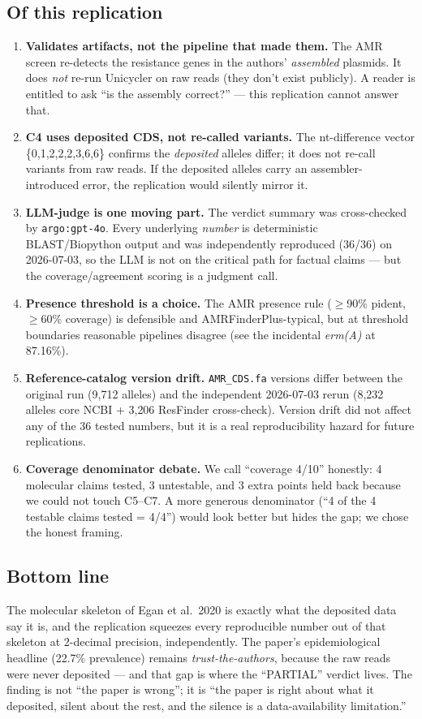 \documentclass[11pt,letterpaper]{article}
\begin{document}
\subsection{Of this replication}
\begin{enumerate}[leftmargin=*]
\item \textbf{Validates artifacts, not the pipeline that made them.} The AMR screen re-detects the resistance genes in the authors' \emph{assembled} plasmids. It does \emph{not} re-run Unicycler on raw reads (they don't exist publicly). A reader is entitled to ask ``is the assembly correct?'' --- this replication cannot answer that.
\item \textbf{C4 uses deposited CDS, not re-called variants.} The nt-difference vector \{0,1,2,2,2,3,6,6\} confirms the \emph{deposited} alleles differ; it does not re-call variants from raw reads. If the deposited alleles carry an assembler-introduced error, the replication would silently mirror it.
\item \textbf{LLM-judge is one moving part.} The verdict summary was cross-checked by \texttt{argo:gpt-4o}. Every underlying \emph{number} is deterministic BLAST/Biopython output and was independently reproduced (36/36) on 2026-07-03, so the LLM is not on the critical path for factual claims --- but the coverage/agreement scoring is a judgment call.
\item \textbf{Presence threshold is a choice.} The AMR presence rule ($\geq$90\% pident, $\geq$60\% coverage) is defensible and AMRFinderPlus-typical, but at threshold boundaries reasonable pipelines disagree (see the incidental \emph{erm(A)} at 87.16\%).
\item \textbf{Reference-catalog version drift.} \texttt{AMR\_CDS.fa} versions differ between the original run (9{,}712 alleles) and the independent 2026-07-03 rerun (8{,}232 alleles core NCBI + 3{,}206 ResFinder cross-check). Version drift did not affect any of the 36 tested numbers, but it is a real reproducibility hazard for future replications.
\item \textbf{Coverage denominator debate.} We call ``coverage 4/10'' honestly: 4 molecular claims tested, 3 untestable, and 3 extra points held back because we could not touch C5--C7. A more generous denominator (``4 of the 4 testable claims tested = 4/4'') would look better but hides the gap; we chose the honest framing.
\end{enumerate}

\subsection{Bottom line}
The molecular skeleton of Egan et al.\ 2020 is exactly what the deposited data say it is, and the replication squeezes every reproducible number out of that skeleton at 2-decimal precision, independently. The paper's epidemiological headline (22.7\% prevalence) remains \emph{trust-the-authors}, because the raw reads were never deposited --- and that gap is where the ``PARTIAL'' verdict lives. The finding is not ``the paper is wrong''; it is ``the paper is right about what it deposited, silent about the rest, and the silence is a data-availability limitation.''
\end{document}
